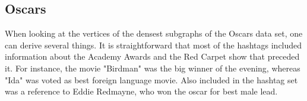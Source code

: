 \documentclass[10pt,a4paper]{article}
\begin{document}
\subsection{Oscars}

When looking at the vertices of the densest subgraphs of the Oscars data set, one can derive several things. It is straightforward that most of the hashtags included information about the Academy Awards and the Red Carpet show that preceded it. For instance, the movie "Birdman" was the big winner of the evening, whereas "Ida" was voted as best foreign language movie. Also included in the hashtag set was a reference to Eddie Redmayne, who won the oscar for best male lead.
\end{document}
